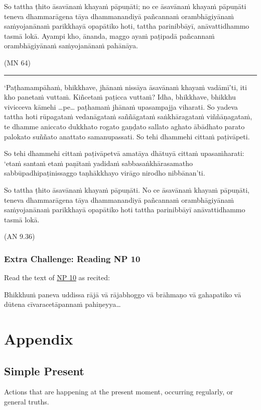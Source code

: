 \documentclass[11pt,oneside]{memoir}
\begin{document}
So tattha ṭhito āsavānaṁ khayaṁ pāpuṇāti; no ce āsavānaṁ khayaṁ pāpuṇāti teneva
dhammarāgena tāya dhammanandiyā pañcannaṁ orambhāgiyānaṁ saṁyojanānaṁ parikkhayā
opapātiko hoti, tattha parinibbāyī, anāvattidhammo tasmā lokā. Ayampi kho,
ānanda, maggo ayaṁ paṭipadā pañcannaṁ orambhāgiyānaṁ saṁyojanānaṁ pahānāya.

(MN 64)

\noindent\rule{\textwidth}{0.5pt}

‘Paṭhamampāhaṁ, bhikkhave, jhānaṁ nissāya āsavānaṁ khayaṁ vadāmī’ti, iti kho
panetaṁ vuttaṁ. Kiñcetaṁ paṭicca vuttaṁ? Idha, bhikkhave, bhikkhu vivicceva
kāmehi …pe… paṭhamaṁ jhānaṁ upasampajja viharati. So yadeva tattha hoti
rūpagataṁ vedanāgataṁ saññāgataṁ saṅkhāragataṁ viññāṇagataṁ, te dhamme aniccato
dukkhato rogato gaṇḍato sallato aghato ābādhato parato palokato suññato anattato
samanupassati. So tehi dhammehi cittaṁ paṭivāpeti.

So tehi dhammehi cittaṁ paṭivāpetvā amatāya dhātuyā cittaṁ upasaṁharati: ‘etaṁ
santaṁ etaṁ paṇītaṁ yadidaṁ sabbasaṅkhārasamatho sabbūpadhipaṭinissaggo
taṇhākkhayo virāgo nirodho nibbānan’ti.

So tattha ṭhito āsavānaṁ khayaṁ pāpuṇāti. No ce āsavānaṁ khayaṁ
pāpuṇāti, teneva dhammarāgena tāya dhammanandiyā pañcannaṁ orambhāgiyānaṁ
saṁyojanānaṁ parikkhayā opapātiko hoti tattha parinibbāyī anāvattidhammo tasmā
lokā.

(AN 9.36)

\subsection{Extra Challenge: Reading NP 10}
\label{sec:orgde8bc80}

Read the text of \href{https://suttacentral.net/pli-tv-bu-vb-np10/en/brahmali}{NP 10} as recited:

Bhikkhuṁ paneva uddissa rājā vā rājabhoggo vā brāhmaṇo vā gahapatiko vā dūtena cīvaracetāpannaṁ pahiṇeyya\ldots{}

\chapter{Appendix}
\label{sec:org142ea69}
\section{Simple Present}
\label{sec:org4d52326}

Actions that are happening at the present moment, occurring regularly, or general truths.
\end{document}
